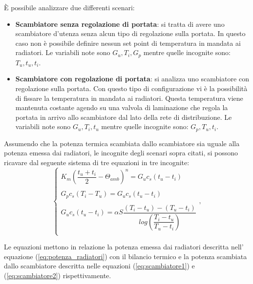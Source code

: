\documentclass[laurea,oneside,11pt]{USiena_tesiLM3}
\begin{document}
\`E possibile analizzare due differenti scenari:
\begin{itemize}
\item \textbf{Scambiatore senza regolazione di portata}: si tratta di avere uno scambiatore d'utenza senza alcun tipo di regolazione sulla portata. In questo caso non è possibile definire nessun set point di temperatura in mandata ai radiatori. Le variabili note sono $G_u, T_i, G_p$ mentre quelle incognite sono: $T_u, t_u, t_i$.

\item \textbf{Scambiatore con regolazione di portata}: si analizza uno scambiatore con regolazione sulla portata. Con questo tipo di configurazione vi è la possibilità di fissare la temperatura in mandata ai radiatori. Questa temperatura viene mantenuta costante agendo su una valvola di laminazione che regola la portata in arrivo allo scambiatore dal lato della rete di distribuzione.   Le  variabili note sono $G_u, T_i, t_u$ mentre quelle incognite sono: $G_p, T_u, t_i$.
\end{itemize}
Assumendo che la potenza termica scambiata dallo scambiatore sia uguale alla potenza emessa dai radiatori, le incognite degli scenari sopra citati, si possono ricavare dal seguente sistema di  tre equazioni in tre incognite: 
\begin{equation}
\left \{
\begin{array}{rl}
K_m(\dfrac{t_u + t_i}{2} - \Theta_{amb})^n = G_u c_s (t_u - t_i)\\
\\
G_p c_s (T_i - T_u) = G_u c_s (t_u - t_i)\\
\\
G_u c_s (t_u - t_i) = \alpha S \dfrac{(T_i - t_u)-(T_u - t_i )}{log\left( \dfrac{T_i - t_u}{T_u - t_i } \right)}\\
\end{array}
\right. ,
\end{equation}

Le equazioni mettono in relazione la potenza emessa dai radiatori descritta nell' equazione (\ref{eq:potenza_radiatori}) con il bilancio termico e la potenza scambiata dallo scambiatore descritta nelle equazioni (\ref{eq:scambiatore1}) e (\ref{eq:scambiatore2}) rispettivamente.
\end{document}
